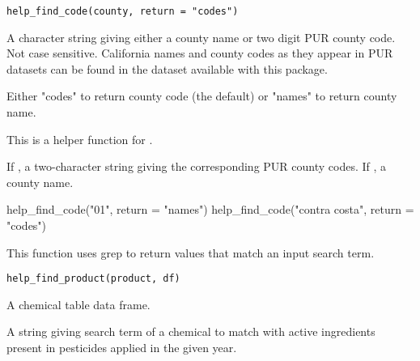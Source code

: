 \documentclass[a4paper]{book}
\begin{document}
%
\begin{Usage}
\begin{verbatim}
help_find_code(county, return = "codes")
\end{verbatim}
\end{Usage}
%
\begin{Arguments}
\begin{ldescription}
\item[\code{county}] A character string giving either a county name or
two digit PUR county code. Not case sensitive. California names and county
codes as they appear in PUR datasets can be found in the 
dataset available with this package.

\item[\code{return}] Either "codes" to return county code (the default) or "names"
to return county name.
\end{ldescription}
\end{Arguments}
%
\begin{Details}\relax
This is a helper function for .
\end{Details}
%
\begin{Value}
If , a two-character string giving
the corresponding PUR county codes. If , a county
name.
\end{Value}
%
\begin{Examples}
\begin{ExampleCode}
help_find_code("01", return = "names")
help_find_code("contra costa", return = "codes")
\end{ExampleCode}
\end{Examples}
%
\begin{Description}\relax
This function uses grep to return  values that match an input
search term.
\end{Description}
%
\begin{Usage}
\begin{verbatim}
help_find_product(product, df)
\end{verbatim}
\end{Usage}
%
\begin{Arguments}
\begin{ldescription}
\item[\code{df}] A chemical table data frame.

\item[\code{chemical}] A string giving search term of a
chemical to match with active ingredients present in pesticides applied
in the given year.
\end{ldescription}
\end{Arguments}
\end{document}
